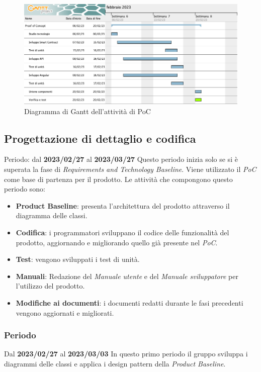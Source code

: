\begin{figure}[H]
    \centering
    \includegraphics[scale=0.4]{src/img/Gantt PoC.png}
    \caption{Diagramma di Gantt dell'attività di PoC}
\end{figure}

\subsection{Progettazione di dettaglio e codifica}
Periodo: dal \textbf{2023/02/27} al \textbf{2023/03/27} \newline
Questo periodo inizia solo se si è superata la fase di \textit{Requirements and Technology Baseline}. Viene utilizzato il \textit{PoC}
come base di partenza per il prodotto. Le attività che compongono questo periodo sono:
\begin{itemize}
        \item \textbf{Product Baseline\glo}: presenta l'architettura del prodotto attraverso il diagramma delle classi.
        \item \textbf{Codifica}: i programmatori sviluppano il codice delle funzionalità del prodotto, aggiornando e migliorando quello già presente nel \textit{PoC}.
        \item \textbf{Test}: vengono sviluppati i test di unità.
        \item \textbf{Manuali}: Redazione del \textit{Manuale utente} e del \textit{Manuale sviluppatore} per l'utilizzo del prodotto.
        \item \textbf{Modifiche ai documenti}: i documenti redatti durante le fasi precedenti vengono aggiornati e migliorati.
\end{itemize}

\subsubsection{ Periodo}
Dal \textbf{2023/02/27} al \textbf{2023/03/03}
\newline
In questo primo periodo il gruppo sviluppa i diagrammi delle classi e applica i design pattern della \textit{Product Baseline}.
